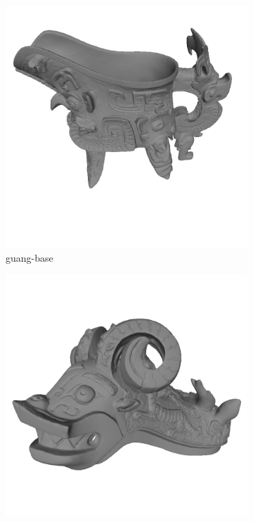 \begin{figure}
	\centering
	\begin{subfigure}[b]{0.23\linewidth}
		\includegraphics[width=\linewidth]{./Figures/train-dataset/48.guang-base.png}
		\caption{guang-base}
	\end{subfigure}
	\begin{subfigure}[b]{0.23\linewidth}
		\includegraphics[width=\linewidth]{./Figures/train-dataset/49.guang-lid.png}

\end{subfigure}
\end{figure}
